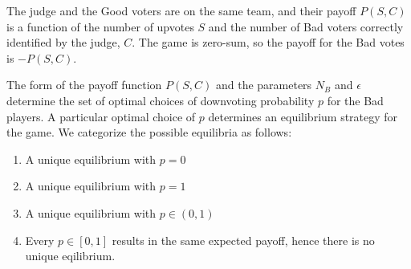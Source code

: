 \documentclass[11pt]{article}
\begin{document}
The judge and the Good voters are on the same team, and their payoff
$P(S, C)$ is a function of the number of upvotes $S$ and the number of
Bad voters correctly identified by the judge, $C$.  The game is
zero-sum, so the payoff for the Bad votes is $-P(S, C)$.

The form of the payoff function $P(S,C)$ and the parameters $N_B$ and
$\epsilon$ determine the set of optimal choices of downvoting
probability $p$ for the Bad players.  A particular optimal choice of
$p$ determines an equilibrium strategy for the game.  We categorize
the possible equilibria as follows:
\begin{enumerate}
\item A unique equilibrium with $p = 0$
\item A unique equilibrium with $p = 1$
\item A unique equilibrium with $p \in (0, 1)$
\item Every $p \in [0,1]$ results in the same expected payoff, hence
  there is no unique eqilibrium.
\end{enumerate}
\end{document}
